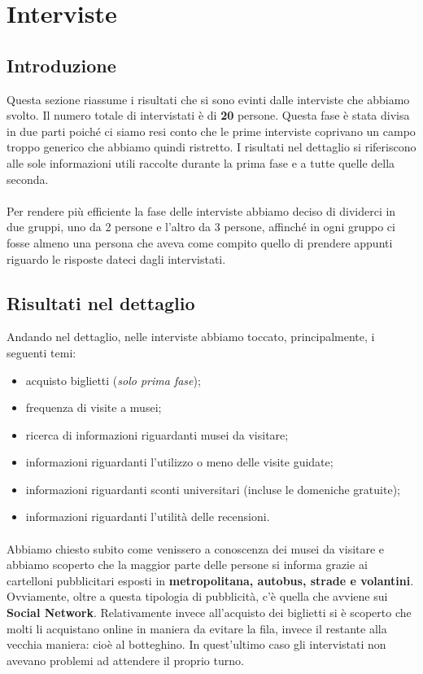 \def\people{20}

\section{Interviste}

\subsection{Introduzione}
Questa sezione riassume i risultati che si sono evinti dalle interviste che abbiamo svolto. Il numero totale di intervistati è di \textbf{\people} persone. Questa fase è stata divisa in due parti poiché ci siamo resi conto che le prime interviste coprivano un campo troppo generico che abbiamo quindi ristretto. I risultati nel dettaglio si riferiscono alle sole informazioni utili raccolte durante la prima fase e a tutte quelle della seconda.

\paragraph{}
Per rendere più efficiente la fase delle interviste abbiamo deciso di dividerci in due gruppi, uno da 2 persone e l'altro da 3 persone, affinché in ogni gruppo ci fosse almeno una persona che aveva come compito quello di prendere appunti riguardo le risposte dateci dagli intervistati.

\subsection{Risultati nel dettaglio}
Andando nel dettaglio, nelle interviste abbiamo toccato, principalmente, i seguenti temi:
    \begin{itemize}
      \item acquisto biglietti (\textit{solo prima fase});
        \item frequenza di visite a musei;
        \item ricerca di informazioni riguardanti musei da visitare;
        \item informazioni riguardanti l'utilizzo o meno delle visite guidate;
        \item informazioni riguardanti sconti universitari (incluse le domeniche gratuite);
        \item informazioni riguardanti l'utilità delle recensioni.
    \end{itemize}
    
\paragraph{}    
Abbiamo chiesto subito come venissero a conoscenza dei musei da visitare e abbiamo scoperto che la maggior parte delle persone si informa grazie ai cartelloni pubblicitari esposti in \textbf{metropolitana, autobus, strade e volantini}. Ovviamente, oltre a questa tipologia di pubblicità, c'è quella che avviene sui \textbf{Social Network}. Relativamente invece all'acquisto dei biglietti si è scoperto che molti li acquistano online in maniera da evitare la fila, invece il restante alla vecchia maniera: cioè al botteghino. In quest'ultimo caso gli intervistati non avevano problemi ad attendere il proprio turno.

